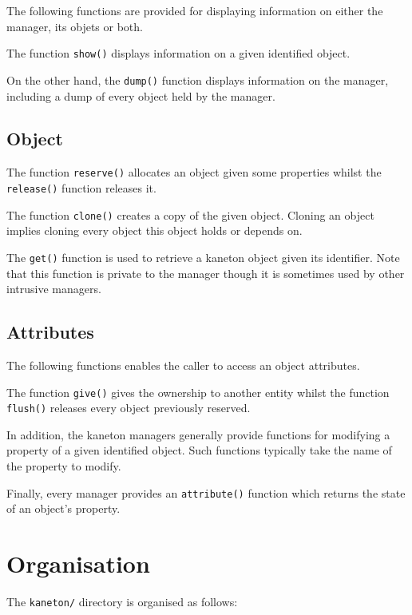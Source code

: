The following functions are provided for displaying information on either
the manager, its objets or both.

The function \texttt{show()} displays information on a given identified object.

On the other hand, the \texttt{dump()} function displays information on the
manager, including a dump of every object held by the manager.


\subsection*{Object}

The function \texttt{reserve()} allocates an object given some properties
whilst the \texttt{release()} function releases it.

The function \texttt{clone()} creates a copy of the given object. Cloning an
object implies cloning every object this object holds or depends on.

The \texttt{get()} function is used to retrieve a kaneton object given its
identifier. Note that this function is private to the manager though it is
sometimes used by other intrusive managers.


\subsection*{Attributes}

The following functions enables the caller to access an object attributes.

The function \texttt{give()} gives the ownership to another entity whilst
the function \texttt{flush()} releases every object previously reserved.

In addition, the kaneton managers generally provide functions for modifying
a property of a given identified object. Such functions typically take the
name of the property to modify.

Finally, every manager provides an \texttt{attribute()} function which
returns the state of an object's property.

%
%

\section{Organisation}

The \texttt{kaneton/} directory is organised as follows:

